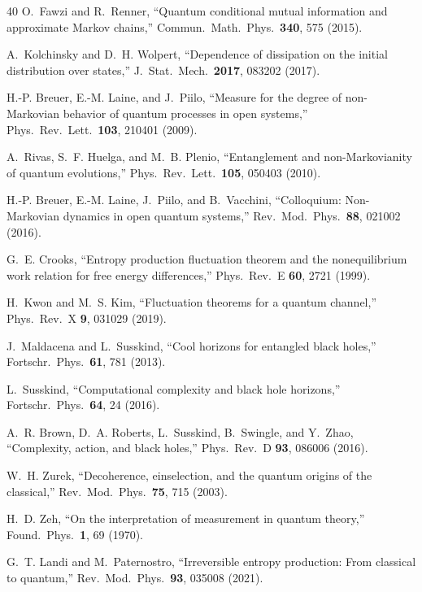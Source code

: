 \documentclass[prl,twocolumn,superscriptaddress,longbibliography,floatfix]{revtex4-2}
\begin{document}
\begin{thebibliography}{40}
O.~Fawzi and R.~Renner,
``Quantum conditional mutual information and approximate Markov
chains,''
Commun.\ Math.\ Phys.\ \textbf{340}, 575 (2015).

A.~Kolchinsky and D.~H. Wolpert,
``Dependence of dissipation on the initial distribution over states,''
J.\ Stat.\ Mech.\ \textbf{2017}, 083202 (2017).

H.-P. Breuer, E.-M. Laine, and J.~Piilo,
``Measure for the degree of non-Markovian behavior of quantum
processes in open systems,''
Phys.\ Rev.\ Lett.\ \textbf{103}, 210401 (2009).

A.~Rivas, S.~F. Huelga, and M.~B. Plenio,
``Entanglement and non-Markovianity of quantum evolutions,''
Phys.\ Rev.\ Lett.\ \textbf{105}, 050403 (2010).

H.-P. Breuer, E.-M. Laine, J.~Piilo, and B.~Vacchini,
``Colloquium: Non-Markovian dynamics in open quantum systems,''
Rev.\ Mod.\ Phys.\ \textbf{88}, 021002 (2016).

G.~E. Crooks,
``Entropy production fluctuation theorem and the nonequilibrium
work relation for free energy differences,''
Phys.\ Rev.\ E \textbf{60}, 2721 (1999).

H.~Kwon and M.~S. Kim,
``Fluctuation theorems for a quantum channel,''
Phys.\ Rev.\ X \textbf{9}, 031029 (2019).

J.~Maldacena and L.~Susskind,
``Cool horizons for entangled black holes,''
Fortschr.\ Phys.\ \textbf{61}, 781 (2013).

L.~Susskind,
``Computational complexity and black hole horizons,''
Fortschr.\ Phys.\ \textbf{64}, 24 (2016).

A.~R. Brown, D.~A. Roberts, L.~Susskind, B.~Swingle, and Y.~Zhao,
``Complexity, action, and black holes,''
Phys.\ Rev.\ D \textbf{93}, 086006 (2016).

W.~H. Zurek,
``Decoherence, einselection, and the quantum origins of the
classical,''
Rev.\ Mod.\ Phys.\ \textbf{75}, 715 (2003).

H.~D. Zeh,
``On the interpretation of measurement in quantum theory,''
Found.\ Phys.\ \textbf{1}, 69 (1970).

G.~T. Landi and M.~Paternostro,
``Irreversible entropy production: From classical to quantum,''
Rev.\ Mod.\ Phys.\ \textbf{93}, 035008 (2021).


\end{thebibliography}
\end{document}
